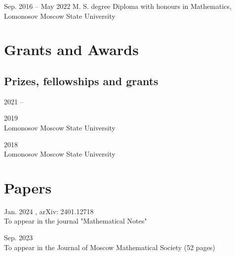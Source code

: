 \documentclass[11pt,letterpaper]{report}
\begin{document}
    \begin{tablist}

        \item[Sep. 2016 -- May 2022]  \tab{}M. S. degree Diploma with honours in Mathematics,\\ Lomonosov Moscow State University 

    \end{tablist}
    
    
    
    
    
    \section*{Grants and Awards}

    \subsection*{Prizes, fellowships and grants}

    \begin{tablist}

        \item[2021 --]  
        \item[2019] \\ Lomonosov Moscow State University
        \item[2018] \\ Lomonosov Moscow State University

    \end{tablist}




    


    \section*{Papers}

    \begin{tablist}

        \item[Jan. 2024] , arXiv: 2401.12718\\ To appear in the journal "Mathematical Notes"
        \item[Sep. 2023] \\ To appear in the Journal of Moscow Mathematical Society (52 pages)
        
    \end{tablist}
    
\end{document}
